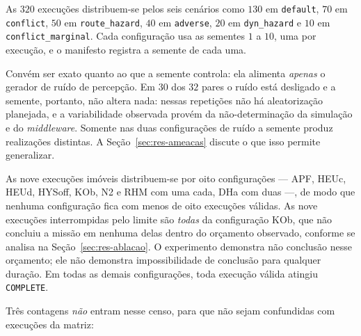 \begin{sloppypar}
As $320$ execuções distribuem-se pelos seis cenários como $130$ em
\texttt{default}, $70$ em \texttt{conflict}, $50$ em \texttt{route\_hazard}, $40$ em
\texttt{adverse}, $20$ em \texttt{dyn\_hazard} e $10$ em
\texttt{conflict\_marginal}. Cada configuração usa as sementes $1$ a $10$, uma por
execução, e o manifesto registra a semente de cada uma.
\end{sloppypar}

Convém ser exato quanto ao que a semente controla: ela alimenta \emph{apenas} o gerador
de ruído de percepção. Em $30$ dos $32$ pares o ruído está desligado e a semente,
portanto, não altera nada: nessas repetições não há aleatorização planejada, e a
variabilidade observada provém da não-determinação da simulação e do
\textit{middleware}. Somente nas duas configurações de ruído a semente produz
realizações distintas. A Seção~\ref{sec:res-ameacas} discute o que isso permite
generalizar.

As nove execuções imóveis distribuem-se por oito configurações --- APF, HEUc, HEUd,
HYSoff, KOb, N2 e RHM com uma cada, DHa com duas ---, de modo que nenhuma configuração
fica com menos de oito execuções válidas. As nove execuções interrompidas pelo limite
são \emph{todas} da configuração KOb, que não concluiu a missão em nenhuma delas dentro
do orçamento observado, conforme se analisa na Seção~\ref{sec:res-ablacao}. O
experimento demonstra não conclusão nesse orçamento; ele não demonstra impossibilidade de
conclusão para qualquer duração. Em todas as demais configurações, toda
execução válida atingiu \texttt{COMPLETE}.

Três contagens \emph{não} entram nesse censo, para que não sejam confundidas com
execuções da matriz:

